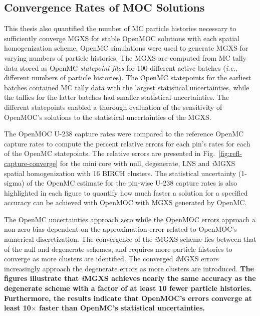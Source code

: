 \documentclass[12pt,twoside]{mitthesis-exec}
\begin{document}
\subsection*{Convergence Rates of MOC Solutions}

This thesis also quantified the number of MC particle histories necessary to sufficiently converge MGXS for stable OpenMOC solutions with each spatial homogenization scheme. OpenMC simulations were used to generate MGXS for varying numbers of particle histories. The MGXS are computed from MC tally data stored as OpenMC \textit{statepoint files} for 100 different active batches (\textit{i.e.}, different numbers of particle histories). The OpenMC statepoints for the earliest batches contained MC tally data with the largest statistical uncertainties, while the tallies for the latter batches had smaller statistical uncertainties. The different statepoints enabled a thorough evaluation of the sensitivity of OpenMOC's solutions to the statistical uncertainties of the MGXS.

The OpenMOC U-238 capture rates were compared to the reference OpenMC capture rates to compute the percent relative errors for each pin's rates for each of the OpenMC statepoints. The relative errors are presented in Fig.~\ref{fig:refl-capture-converge} for the mini core with null, degenerate, LNS and \textit{i}MGXS spatial homogenization with 16 BIRCH clusters. The statistical uncertainty (1-sigma) of the OpenMC estimate for the pin-wise U-238 capture rates is also highlighted in each figure to quantify how much faster a solution for a specified accuracy can be achieved with OpenMOC with MGXS generated by OpenMC.

The OpenMC uncertainties approach zero while the OpenMOC errors approach a non-zero bias dependent on the approximation error related to OpenMOC's numerical discretization. The convergence of the \textit{i}MGXS scheme lies between that of the null and degenerate schemes, and requires more particle histories to converge as more clusters are identified. The converged \textit{i}MGXS errors increasingly approach the degenerate errors as more clusters are introduced. \textbf{The figures illustrate that \textit{i}MGXS achieves nearly the same accuracy as the degenerate scheme with a factor of at least 10 fewer particle histories. Furthermore, the results indicate that OpenMOC's errors converge at least 10$\times$ faster than OpenMC's statistical uncertainties.}
 
\end{document}

